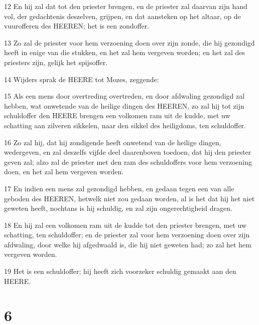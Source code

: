 \par 12 En hij zal dat tot den priester brengen, en de priester zal daarvan zijn hand vol, der gedachtenis deszelven, grijpen, en dat aansteken op het altaar, op de vuurofferen des HEEREN; het is een zondoffer.
\par 13 Zo zal de priester voor hem verzoening doen over zijn zonde, die hij gezondigd heeft in enige van die stukken, en het zal hem vergeven worden; en het zal des priesters zijn, gelijk het spijsoffer.
\par 14 Wijders sprak de HEERE tot Mozes, zeggende:
\par 15 Als een mens door overtreding overtreden, en door afdwaling gezondigd zal hebben, wat onwetende van de heilige dingen des HEEREN, zo zal hij tot zijn schuldoffer den HEERE brengen een volkomen ram uit de kudde, met uw schatting aan zilveren sikkelen, naar den sikkel des heiligdoms, ten schuldoffer.
\par 16 Zo zal hij, dat hij zondigende heeft onwetend van de heilige dingen, wedergeven, en zal deszelfs vijfde deel daarenboven toedoen, dat hij den priester geven zal; alzo zal de priester met den ram des schuldoffers voor hem verzoening doen, en het zal hem vergeven worden.
\par 17 En indien een mens zal gezondigd hebben, en gedaan tegen een van alle geboden des HEEREN, hetwelk niet zou gedaan worden, al is het dat hij het niet geweten heeft, nochtans is hij schuldig, en zal zijn ongerechtigheid dragen.
\par 18 En hij zal een volkomen ram uit de kudde tot den priester brengen, met uw schatting, ten schuldoffer; en de priester zal voor hem verzoening doen over zijn afdwaling, door welke hij afgedwaald is, die hij niet geweten had; zo zal het hem vergeven worden.
\par 19 Het is een schuldoffer; hij heeft zich voorzeker schuldig gemaakt aan den HEERE.

\chapter{6}

